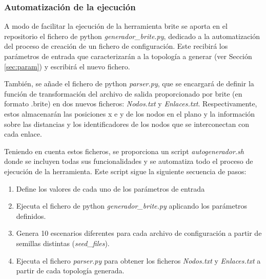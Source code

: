 \vspace{3mm}

\subsubsection{Automatización de la ejecución}
\label{sec:brite_eje}

A modo de facilitar la ejecución de la herramienta \gls{brite} se aporta en el repositorio el fichero de python \textit{generador\_brite.py}, dedicado a la automatización del proceso de creación de un fichero de configuración. Este recibirá los parámetros de entrada que caracterizarán a la topología a generar (ver Sección \ref{sec:param}) y escribirá el nuevo fichero.

\vspace{3mm}

También, se añade el fichero de python \textit{parser.py}, que se encargará de definir la función de transformación del archivo de salida proporcionado por \gls{brite} (en formato .brite) en dos nuevos ficheros: \textit{Nodos.txt} y \textit{Enlaces.txt}. Respectivamente, estos almacenarán las posiciones x e y de los nodos en el plano y la información sobre las distancias y los identificadores de los nodos que se interconectan con cada enlace.

\vspace{3mm}

Teniendo en cuenta estos ficheros, se proporciona un script \textit{autogenerador.sh} donde se incluyen todas sus funcionalidades y se automatiza todo el proceso de ejecución de la herramienta. Este script sigue la siguiente secuencia de pasos:

\begin{enumerate}
    \item Define los valores de cada uno de los parámetros de entrada
    \item Ejecuta el fichero de python \textit{generador\_brite.py} aplicando los parámetros definidos.
    \item Genera 10 escenarios diferentes para cada archivo de configuración a partir de semillas distintas (\textit{seed\_files}).
    \item Ejecuta el fichero \textit{parser.py} para obtener los ficheros \textit{Nodos.txt} y \textit{Enlaces.txt} a partir de cada topología generada.    
\end{enumerate}

\vspace{1mm}

